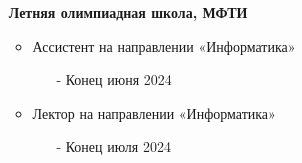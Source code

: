 \documentclass[10pt,a4paper]{altacv}
\begin{document}
\begin{itemize}
\item[] \textbf{Летняя олимпиадная школа, МФТИ}
\begin{itemize}
    \item Ассистент на направлении «Информатика»
    \begin{itemize}
        \item[-] Конец июня 2024
    \end{itemize}
        \item Лектор на направлении «Информатика»
    \begin{itemize}
        \item[-] Конец июля 2024
    \end{itemize}
\end{itemize}

\end{itemize}
\clearpage
\end{document}
